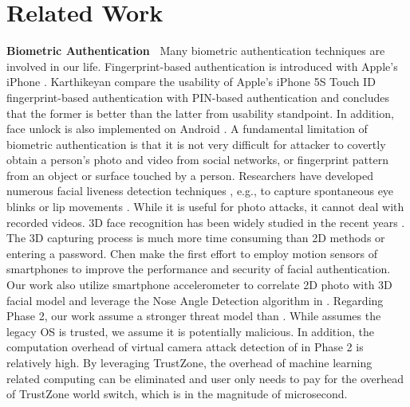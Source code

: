 \section{Related Work}
\label{sec:related}

\noindent
{\bf Biometric Authentication~} 
Many biometric authentication techniques are involved in our life.
Fingerprint-based authentication is introduced with Apple's iPhone
\cite{iphone}. Karthikeyan \etal \cite{cmu-finger} compare the usability of
Apple’s iPhone 5S Touch ID fingerprint-based authentication with PIN-based
authentication and concludes that the former is better than the latter from
usability standpoint. In addition, face unlock is also implemented on Android
\cite{face-unlock}.  A fundamental limitation of biometric authentication is
that it is not very difficult for attacker to covertly obtain a person's photo
and video from social networks, or fingerprint pattern from an object or surface
touched by a person.  Researchers have developed numerous facial liveness
detection techniques \cite{Jain-MSU}, e.g., to capture spontaneous eye blinks or
lip movements \cite{Pan-ICCV}.  While it is useful for photo attacks, it cannot
deal with recorded videos.  3D face recognition has been widely studied in the
recent years \cite{Wang-PAMI, Amberg-FG, Chaua-3D}.  The 3D capturing process is
much more time consuming than 2D methods or entering a password.  Chen \etal
\cite{Chen-Sensor} make the first effort to employ motion sensors of smartphones
to improve the performance and security of facial authentication.  Our work also
utilize smartphone accelerometer to correlate 2D photo with 3D facial model and
leverage the Nose Angle Detection algorithm in \cite{Chen-Sensor}.  Regarding
Phase 2, our work assume a stronger threat model than \cite{Chen-Sensor}. While
\cite{Chen-Sensor} assumes the legacy OS is trusted, we assume it is potentially
malicious. In addition, the computation overhead of virtual camera attack
detection of \cite{Chen-Sensor} in Phase 2 is relatively high. By leveraging TrustZone, the overhead
of machine learning related computing can be eliminated and user only needs to
pay for the overhead of TrustZone world switch, which is in the magnitude of microsecond. 


